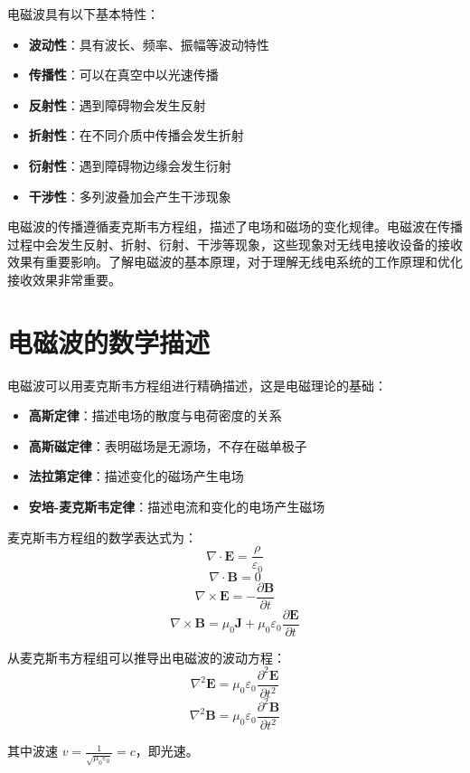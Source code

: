 \documentclass[12pt,UTF8]{ctexbook}
\begin{document}
电磁波具有以下基本特性：

\begin{itemize}[leftmargin=3.5em]
    \item \textbf{波动性}：具有波长、频率、振幅等波动特性
    \item \textbf{传播性}：可以在真空中以光速传播
    \item \textbf{反射性}：遇到障碍物会发生反射
    \item \textbf{折射性}：在不同介质中传播会发生折射
    \item \textbf{衍射性}：遇到障碍物边缘会发生衍射
    \item \textbf{干涉性}：多列波叠加会产生干涉现象
\end{itemize}

电磁波的传播遵循麦克斯韦方程组，描述了电场和磁场的变化规律。电磁波在传播过程中会发生反射、折射、衍射、干涉等现象，这些现象对无线电接收设备的接收效果有重要影响。了解电磁波的基本原理，对于理解无线电系统的工作原理和优化接收效果非常重要。

\section{电磁波的数学描述}

电磁波可以用麦克斯韦方程组进行精确描述，这是电磁理论的基础：

\begin{itemize}[leftmargin=3.5em]
    \item \textbf{高斯定律}：描述电场的散度与电荷密度的关系
    \item \textbf{高斯磁定律}：表明磁场是无源场，不存在磁单极子
    \item \textbf{法拉第定律}：描述变化的磁场产生电场
    \item \textbf{安培-麦克斯韦定律}：描述电流和变化的电场产生磁场
\end{itemize}

麦克斯韦方程组的数学表达式为：
\[ \nabla \cdot \mathbf{E} = \frac{\rho}{\varepsilon_0} \]
\[ \nabla \cdot \mathbf{B} = 0 \]
\[ \nabla \times \mathbf{E} = -\frac{\partial \mathbf{B}}{\partial t} \]
\[ \nabla \times \mathbf{B} = \mu_0\mathbf{J} + \mu_0\varepsilon_0\frac{\partial \mathbf{E}}{\partial t} \]

从麦克斯韦方程组可以推导出电磁波的波动方程：
\[ \nabla^2 \mathbf{E} = \mu_0\varepsilon_0 \frac{\partial^2 \mathbf{E}}{\partial t^2} \]
\[ \nabla^2 \mathbf{B} = \mu_0\varepsilon_0 \frac{\partial^2 \mathbf{B}}{\partial t^2} \]

其中波速 $v = \frac{1}{\sqrt{\mu_0\varepsilon_0}} = c$，即光速。
\end{document}
